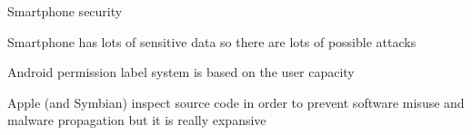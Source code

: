 \begin{frame}[fragile]{Smartphone security}
  
  Smartphone has lots of sensitive data so there are lots of possible attacks

  \vfill
  
  Android permission label system is based on the user capacity

  \vfill

  Apple (and Symbian) inspect source code in order to prevent software misuse
  and malware propagation but it is really expansive

\end{frame}
